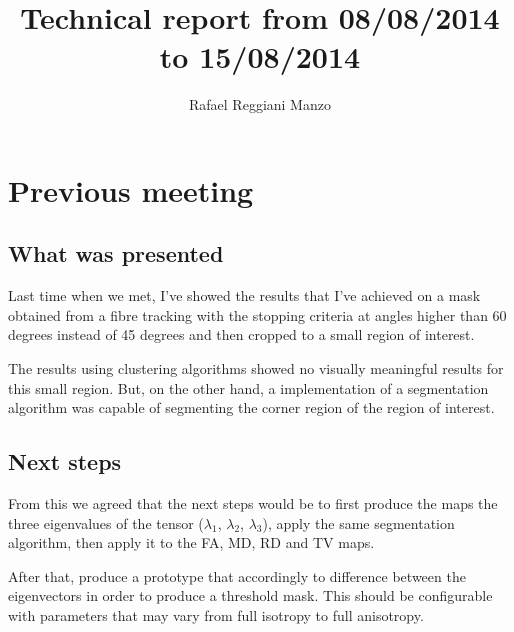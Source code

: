 \documentclass[a4paper,11pt]{report}
\title{Technical report from 08/08/2014 to 15/08/2014}
\author{Rafael Reggiani Manzo}
\begin{document}
\maketitle
\tableofcontents

\chapter{Previous meeting}
  \section{What was presented}
  Last time when we met, I've showed the results that I've achieved on a mask obtained from a fibre tracking with the stopping criteria at angles higher than 60 degrees instead of 45 degrees and then cropped to a small region of interest.

  The results using clustering algorithms showed no visually meaningful results for this small region. But, on the other hand, a implementation of a segmentation algorithm was capable of segmenting the corner region of the region of interest.

  \section{Next steps}
  From this we agreed that the next steps would be to first produce the maps the three eigenvalues of the tensor ($\lambda_1$, $\lambda_2$, $\lambda_3$), apply the same segmentation algorithm, then apply it to the FA, MD, RD and TV maps.

  After that, produce a prototype that accordingly to difference between the eigenvectors in order to produce a threshold mask. This should be configurable with parameters that may vary from full isotropy to full anisotropy.
\end{document}
